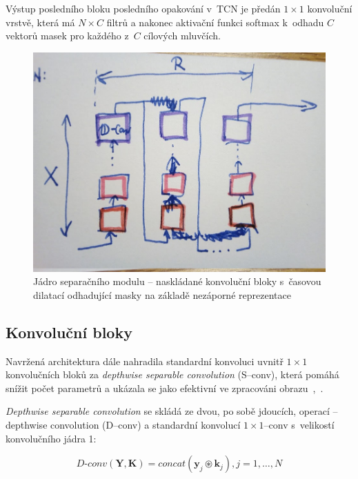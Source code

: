 Výstup posledního bloku posledního opakování v~TCN je předán $1 \times 1$ konvoluční vrstvě, která má $N \times C$ filtrů a nakonec aktivační funkci softmax k~odhadu $C$ vektorů masek pro každého z~$C$ cílových mluvčích.


\begin{figure}[H]
    \centering
    \includegraphics[scale=0.35]{obrazky-figures/stacked_resblocks.jpg}
    \caption{\label{fig:tasnet-stacked-resblocks}Jádro separačního modulu -- naskládané konvoluční bloky s~časovou dilatací odhadující masky na základě nezáporné reprezentace}
\end{figure}



\subsection{Konvoluční bloky}
Navržená architektura dále nahradila standardní konvoluci uvnitř $1 \times 1$ konvolučních bloků za \textit{depthwise separable convolution} (S--conv), která pomáhá snížit počet parametrů a ukázala se jako efektivní ve zpracováni obrazu~\cite{Chollet_2017_CVPR},~\cite{MobileNets}.

\textit{Depthwise separable convolution} se skládá ze dvou, po sobě jdoucích, operací -- depthwise convolution (D--conv) a standardní konvolucí $1 \times 1$--conv s~velikostí konvolučního jádra 1:

\begin{equation}
	D\texttt{-}conv(\boldsymbol{Y}, \boldsymbol{K}) = concat(\boldsymbol{y}_j \circledast \boldsymbol{k}_j), j = 1, \dots, N
\end{equation}

